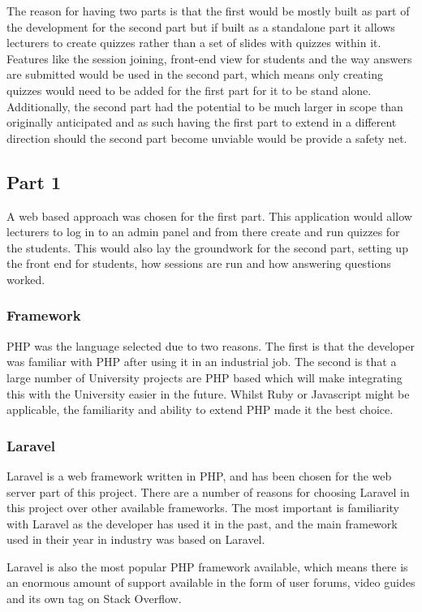 The reason for having two parts is that the first would be mostly built as part of the development for the second part but if built as a standalone part it allows lecturers to create quizzes rather than a set of slides with quizzes within it. Features like the session joining, front-end view for students and the way answers are submitted would be used in the second part, which means only creating quizzes would need to be added for the first part for it to be stand alone. Additionally, the second part had the potential to be much larger in scope than originally anticipated and as such having the first part to extend in a different direction should the second part become unviable would be provide a safety net.

\subsection{Part 1}
A web based approach was chosen for the first part. This application would allow lecturers to log in to an admin panel and from there create and run quizzes for the students. This would also lay the groundwork for the second part, setting up the front end for students, how sessions are run and how answering questions worked. 
\subsubsection{Framework}
PHP was the language selected due to two reasons. The first is that the developer was familiar with PHP after using it in an industrial job. The second is that a large number of University projects are PHP based which will make integrating this with the University easier in the future. Whilst Ruby or Javascript might be applicable, the familiarity and ability to extend PHP made it the best choice.
\subsubsection{Laravel}
Laravel is a web framework written in PHP, and has been chosen for the web server part of this project\cite{laravel}. There are a number of reasons for choosing Laravel in this project over other available frameworks. The most important is familiarity with Laravel as the developer has used it in the past, and the main framework used in their year in industry was based on Laravel.

Laravel is also the most popular PHP framework available\cite{PopularPHPFrameworks}, which means there is an enormous amount of support available in the form of user forums, video guides and its own tag on Stack Overflow.

